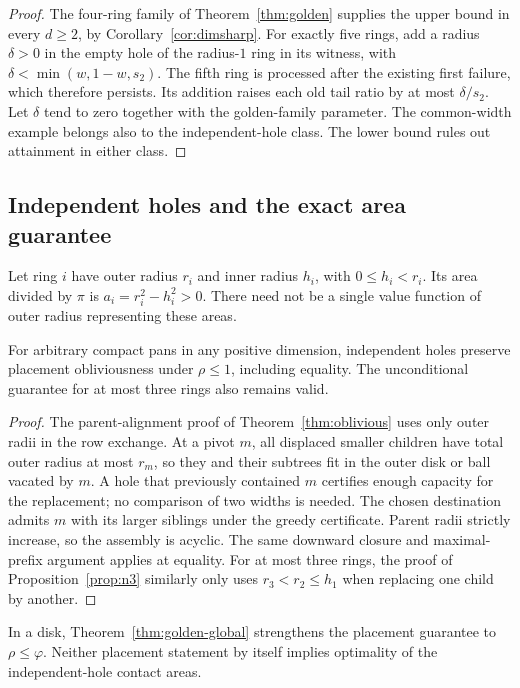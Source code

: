 \begin{proof}
The four-ring family of Theorem~\ref{thm:golden} supplies the upper
bound in every $d\ge2$, by Corollary~\ref{cor:dimsharp}. For exactly
five rings, add a radius $\delta>0$ in the empty hole of the radius-$1$
ring in its witness, with $\delta<\min(w,1-w,s_2)$. The fifth ring
is processed after the existing first failure, which therefore persists.
Its addition raises each old tail ratio by at most $\delta/s_2$.
Let $\delta$ tend to zero together with the golden-family parameter.
The common-width example belongs also to the independent-hole class.
The lower bound rules out attainment in either class.
\end{proof}

\subsection{Independent holes and the exact area guarantee}\label{sec:variablewidth}

Let ring $i$ have outer radius $r_i$ and inner radius $h_i$, with
$0\le h_i<r_i$. Its area divided by $\pi$ is
$a_i=r_i^2-h_i^2>0$. There need not be a single value function of
outer radius representing these areas.

\begin{proposition}\label{prop:independent}
For arbitrary compact pans in any positive dimension, independent holes
preserve placement obliviousness under $\rho\le1$, including equality.
The unconditional guarantee for at most three rings also remains valid.
\end{proposition}
\begin{proof}
The parent-alignment proof of Theorem~\ref{thm:oblivious} uses only
outer radii in the row exchange. At a pivot $m$, all displaced smaller
children have total outer radius at most $r_m$, so they and their
subtrees fit in the outer disk or ball vacated by $m$. A hole that
previously contained $m$ certifies enough capacity for the replacement;
no comparison of two widths is needed. The chosen destination admits
$m$ with its larger siblings under the greedy certificate. Parent radii
strictly increase, so the assembly is acyclic. The same downward closure
and maximal-prefix argument applies at equality. For at most three
rings, the proof of Proposition~\ref{prop:n3} similarly only uses
$r_3<r_2\le h_1$ when replacing one child by another.
\end{proof}

In a disk, Theorem~\ref{thm:golden-global} strengthens the placement
guarantee to $\rho\le\varphi$. Neither placement statement by itself
implies optimality of the independent-hole contact areas.

